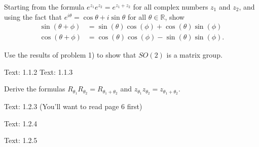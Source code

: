 \documentclass[minion]{homework}
\newcommand{\Reals}{\mathbb{R}}
\begin{document}
\begin{problems}
\problem Starting from the formula $e^{z_1}e^{z_2} = e^{z_1+z_2}$
for all complex numbers $z_1$ and $z_2$, and using the fact
that $e^{i\theta}=\cos\theta+i\sin\theta$ for all $\theta\in\Reals$,
show
\begin{align*}
\sin(\theta+\phi) &= \sin(\theta)\cos(\phi) + \cos(\theta)\sin(\phi)\\
\cos(\theta+\phi) &= \cos(\theta)\cos(\phi) -\sin(\theta) \sin(\phi).
\end{align*}

\problem Use the results of problem 1) to show that $SO(2)$ is a matrix group.

\problem Text: 1.1.2
\problem Text: 1.1.3

\problem Derive the formulas $R_{\theta_1}R_{\theta_2}=R_{\theta_1+\theta_2}$ and
$z_{\theta_1}z_{\theta_2}=z_{\theta_1+\theta_2}$.

\problem  Text: 1.2.3 (You'll want to read page 6 first)

\problem  Text: 1.2.4

\problem  Text: 1.2.5

\end{problems}
\end{document}
